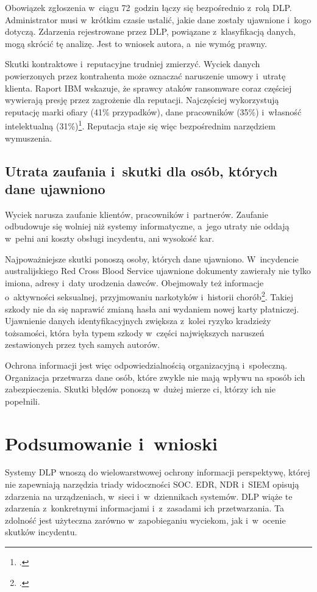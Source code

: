 \documentclass[12pt,a4paper]{article}
\begin{document}
Obowiązek zgłoszenia w~ciągu 72~godzin łączy się bezpośrednio z~rolą
DLP. Administrator musi w~krótkim czasie ustalić, jakie dane zostały
ujawnione i~kogo dotyczą. Zdarzenia rejestrowane przez DLP, powiązane
z~klasyfikacją danych, mogą skrócić tę analizę. Jest to wniosek autora, a~nie
wymóg prawny.

Skutki kontraktowe i~reputacyjne trudniej zmierzyć. Wyciek danych
powierzonych przez kontrahenta może oznaczać naruszenie umowy i~utratę
klienta. Raport IBM wskazuje, że sprawcy ataków ransomware coraz częściej
wywierają presję przez zagrożenie dla reputacji. Najczęściej wykorzystują
reputację marki ofiary (41\% przypadków), dane pracowników (35\%)
i~własność intelektualną (31\%)\footcite{ibm2026cost}. Reputacja staje się
więc bezpośrednim narzędziem wymuszenia.

\subsection{Utrata zaufania i~skutki dla osób, których dane ujawniono}

Wyciek narusza zaufanie klientów, pracowników i~partnerów. Zaufanie
odbudowuje się wolniej niż systemy informatyczne, a~jego utraty nie oddają
w~pełni ani koszty obsługi incydentu, ani wysokość kar.

Najpoważniejsze skutki ponoszą osoby, których dane ujawniono. W~incydencie
australijskiego Red Cross Blood Service ujawnione dokumenty zawierały nie
tylko imiona, adresy i~daty urodzenia dawców. Obejmowały też informacje
o~aktywności seksualnej, przyjmowaniu narkotyków i~historii
chorób\footcite{cheng2017enterprise}. Takiej szkody nie da się naprawić
zmianą hasła ani wydaniem nowej karty płatniczej. Ujawnienie danych
identyfikacyjnych zwiększa z~kolei ryzyko kradzieży tożsamości, która była
typem szkody w~części największych naruszeń zestawionych przez tych samych
autorów.

Ochrona informacji jest więc odpowiedzialnością organizacyjną i~społeczną.
Organizacja przetwarza dane osób, które zwykle nie mają wpływu na sposób ich
zabezpieczenia. Skutki błędów ponoszą w~dużej mierze ci, którzy ich nie
popełnili.

\section{Podsumowanie i~wnioski}

Systemy DLP wnoszą do wielowarstwowej ochrony informacji perspektywę, której
nie zapewniają narzędzia triady widoczności SOC. EDR, NDR i~SIEM opisują
zdarzenia na urządzeniach, w~sieci i~w~dziennikach systemów. DLP wiąże te
zdarzenia z~konkretnymi informacjami i~z~zasadami ich przetwarzania. Ta
zdolność jest użyteczna zarówno w~zapobieganiu wyciekom, jak i~w~ocenie
skutków incydentu.
\end{document}
